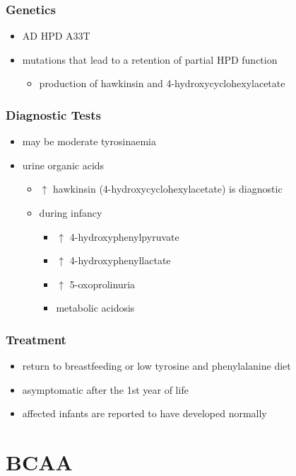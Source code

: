 \documentclass[12pt]{scrartcl}
\begin{document}
\subsubsection{Genetics}
\label{sec:org75e5272}
\begin{itemize}
\item AD HPD A33T
\item mutations that lead to a retention of partial HPD function
\begin{itemize}
\item production of hawkinsin and 4-hydroxycyclohexylacetate
\end{itemize}
\end{itemize}
\subsubsection{Diagnostic Tests}
\label{sec:orgdf9edb6}
\begin{itemize}
\item may be moderate tyrosinaemia
\item urine organic acids
\begin{itemize}
\item \(\uparrow\) hawkinsin (4-hydroxycyclohexylacetate) is diagnostic
\item during infancy
\begin{itemize}
\item \(\uparrow\) 4-hydroxyphenylpyruvate
\item \(\uparrow\) 4-hydroxyphenyllactate
\item \(\uparrow\) 5-oxoprolinuria
\item metabolic acidosis
\end{itemize}
\end{itemize}
\end{itemize}

\subsubsection{Treatment}
\label{sec:org50c736f}
\begin{itemize}
\item return to breastfeeding or low tyrosine and phenylalanine diet
\item asymptomatic after the 1st year of life
\item affected infants are reported to have developed normally
\end{itemize}

\section{BCAA}
\label{sec:orgb57108c}
\end{document}
